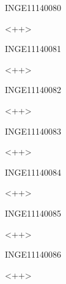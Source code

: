 \documentclass{article}
\begin{document}
\begin{corrige}{INGE11140080}

<++>

\end{corrige}%


\begin{corrige}{INGE11140081}

<++>

\end{corrige}%


\begin{corrige}{INGE11140082}

<++>

\end{corrige}%


\begin{corrige}{INGE11140083}

<++>

\end{corrige}%


\begin{corrige}{INGE11140084}

<++>

\end{corrige}%


\begin{corrige}{INGE11140085}

<++>

\end{corrige}%


\begin{corrige}{INGE11140086}

<++>

\end{corrige}%
\end{document}
